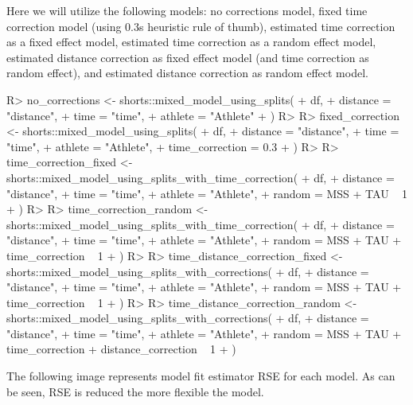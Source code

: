 \documentclass[
]{jss}
\begin{document}
Here we will utilize the following models: no corrections model, fixed time correction model (using 0.3s heuristic rule of thumb), estimated time correction as a fixed effect model, estimated time correction as a random effect model, estimated distance correction as fixed effect model (and time correction as random effect), and estimated distance correction as random effect model.

\begin{CodeChunk}
\begin{CodeInput}
R> no_corrections <- shorts::mixed_model_using_splits(
+   df,
+   distance = "distance",
+   time = "time",
+   athlete = "Athlete"
+ )
R> 
R> fixed_correction <- shorts::mixed_model_using_splits(
+   df,
+   distance = "distance",
+   time = "time",
+   athlete = "Athlete",
+   time_correction = 0.3
+ )
R> 
R> time_correction_fixed <- shorts::mixed_model_using_splits_with_time_correction(
+   df,
+   distance = "distance",
+   time = "time",
+   athlete = "Athlete",
+   random = MSS + TAU ~ 1
+ )
R> 
R> time_correction_random <- shorts::mixed_model_using_splits_with_time_correction(
+   df,
+   distance = "distance",
+   time = "time",
+   athlete = "Athlete",
+   random = MSS + TAU + time_correction ~ 1
+ )
R> 
R> time_distance_correction_fixed <- shorts::mixed_model_using_splits_with_corrections(
+   df,
+   distance = "distance",
+   time = "time",
+   athlete = "Athlete",
+   random = MSS + TAU + time_correction ~ 1
+ )
R> 
R> time_distance_correction_random <- shorts::mixed_model_using_splits_with_corrections(
+   df,
+   distance = "distance",
+   time = "time",
+   athlete = "Athlete",
+   random = MSS + TAU + time_correction + distance_correction ~ 1
+ )
\end{CodeInput}
\end{CodeChunk}

The following image represents model fit estimator RSE for each model. As can be seen, RSE is reduced the more flexible the model.
\end{document}
